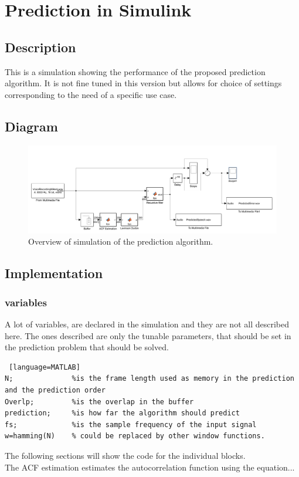 
\section{Prediction in Simulink}


\subsection{Description}
This is a simulation showing the performance of the proposed prediction algorithm. It is not fine tuned in this version but allows for choice of settings corresponding to the need of a specific use case.  


\subsection{Diagram}
\begin{figure} [h]
	\centering
	\includegraphics[width=\textwidth]{../Journal/Code/SimulinkPrediction}
	\caption{Overview of simulation of the prediction algorithm.}
	\label{Fig:PredictionSimulink}
\end{figure}


\subsection{Implementation}

\subsubsection{variables}
A lot of variables, are declared in the simulation and they are not all described here. The ones described are only the tunable parameters, that should be set in the prediction problem that should be solved. 
\begin{lstlisting} [language=MATLAB]
N; 				%is the frame length used as memory in the prediction and the prediction order
Overlp;			%is the overlap in the buffer
prediction; 	%is how far the algorithm should predict 
fs; 			%is the sample frequency of the input signal 
w=hamming(N)	% could be replaced by other window functions.
\end{lstlisting}
The following sections will show the code for the individual blocks. \\
The ACF estimation estimates the autocorrelation function using the equation...
